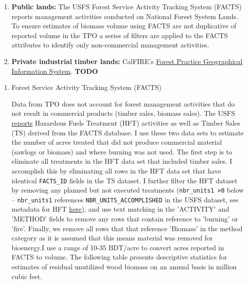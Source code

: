 \documentclass[a4paper]{article}
\begin{document}
\begin{enumerate}
\item \textbf{Public lands:} The USFS Forest Service Activity Tracking System
(FACTS) reports management activities conducted on National Forest
System Lands. To ensure estimates of biomass volume using FACTS are
not duplicative of reported volume in the TPO a series of filters are
applied to the FACTS attributes to identify only non-commercial
management activities.
\item \textbf{Private industrial timber lands:} CalFIRE's
\href{http://www.calfire.ca.gov/resource_mgt/resource_mgt_forestpractice_gis}{Forest
Practice Geographical Information System}. \textbf{TODO}
\end{enumerate}

\begin{enumerate}
\item Forest Service Activity Tracking System (FACTS)
\label{sec-3-5-0-1}

Data from TPO does not account for forest management activities that do
not result in commercial products (timber sales, biomass sales). The
USFS
\href{http://data.fs.usda.gov/geodata/edw/datasets.php?dsetParent=Activities}{reports}
Hazardous Fuels Treatment (HFT) activities as well as Timber Sales (TS)
derived from the FACTS database. I use these two data sets to estimate
the number of acres treated that did not produce commercial material
(sawlogs or biomass) and where burning was not used. The first step is
to eliminate all treatments in the HFT data set that included timber
sales. I accomplish this by eliminating all rows in the HFT data set
that have identical \texttt{FACTS\_ID} fields in the TS dataset. I further
filter the HFT dataset by removing any planned but not executed
treatments (\texttt{nbr\_units1 >0} below -- \texttt{nbr\_units1} references
\texttt{NBR\_UNITS\_ACCOMPLISHED} in the USFS dataset, see metadata for HFT
\href{http://data.fs.usda.gov/geodata/edw/edw_resources/meta/S_USA.Activity_HazFuelTrt_PL.xml}{here}),
and use text matching in the 'ACTIVITY' and 'METHOD' fields to remove
any rows that contain reference to 'burning' or 'fire'. Finally, we
remove all rows that that reference 'Biomass' in the method category as
it is assumed that this means material was removed for bioenergy.I use a
range of 10-35 BDT/acre to convert acres reported in FACTS to volume.
The following table presents descriptive statistics for estimates of
residual unutilized wood biomass on an annual basis in million cubic
feet.


\end{enumerate}
\end{document}
